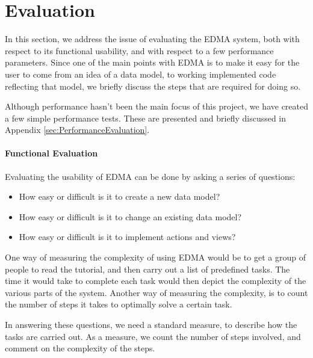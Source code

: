 
\section{\label{sec:Evaluation}Evaluation}

In this section, we address the issue of evaluating the EDMA system,
both with respect to its functional usability, and with respect to
a few performance parameters. Since one of the main points with EDMA
is to make it easy for the user to come from an idea of a data model,
to working implemented code reflecting that model, we briefly discuss
the steps that are required for doing so.

Although performance hasn't been the main focus of this project, we
have created a few simple performance tests. These are presented and
briefly discussed in Appendix \ref{sec:PerformanceEvaluation}.


\paragraph{Functional Evaluation}

Evaluating the usability of EDMA can be done by asking a series of
questions:
\begin{itemize}
\item How easy or difficult is it to create a new data model?
\item How easy or difficult is it to change an existing data model?
\item How easy or difficult is it to implement actions and views?
\end{itemize}
One way of measuring the complexity of using EDMA would be to get
a group of people to read the tutorial, and then carry out a list
of predefined tasks. The time it would take to complete each task
would then depict the complexity of the various parts of the system.
Another way of measuring the complexity, is to count the number of
steps it takes to optimally solve a certain task.

In answering these questions, we need a standard measure, to describe
how the tasks are carried out. As a measure, we count the number of
steps involved, and comment on the complexity of the steps.

